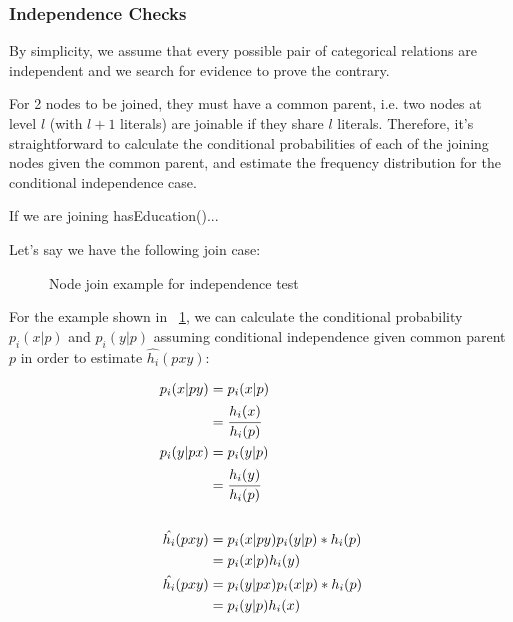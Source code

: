 \subsubsection{Independence Checks}

By simplicity, we assume that every possible pair of categorical relations are independent and we search for evidence to
prove the contrary.

For 2 nodes to be joined, they must have a common parent, i.e. two nodes at level $l$ (with $l+1$ literals) are joinable
if they share $l$ literals. Therefore, it's straightforward to calculate the conditional probabilities of each of the
joining nodes given the common parent, and estimate the frequency distribution for the conditional independence case.

If we are joining hasEducation()...

Let's say we have the following join case:
 
\begin{figure}[!h]
  \caption{Node join example for independence test}
  \centering
  \label{fig:joinIndepExample}
\end{figure}

For the example shown in ~\ref{fig:joinIndepExample}, we can calculate the conditional probability $p_i(x|p)$ and
$p_i(y|p)$ assuming conditional independence given common parent $p$ in order to estimate $\hat{h_i}(p x y)$:

\begin{equation}
\begin{split}
 p_i(x|py) &= p_i(x|p) \\ 
 &= \cfrac{h_i(x)}{h_i(p)} \\ 
 p_i(y|px) &= p_i(y|p) \\ 
 &= \cfrac{h_i(y)}{h_i(p)} \\ \\ 
 \hat{h_i}(pxy) &= p_i(x|py)p_i(y|p)*h_i(p) \\ 
 &= p_i(x|p)h_i(y) \\ 
 \hat{h_i}(pxy) &= p_i(y|px)p_i(x|p)*h_i(p) \\ 
 &= p_i(y|p)h_i(x) 
\end{split}
\end{equation}

